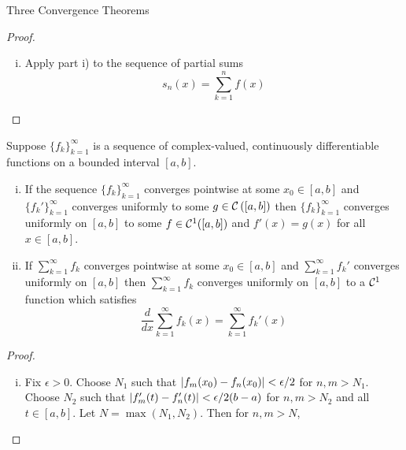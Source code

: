 \begin{section}{Three Convergence Theorems}
\begin{proof}
\begin{enumerate}[i)]
		\item
			Apply part i) to the sequence of partial sums
				\begin{displaymath}
					s_n(x) = \sum_{k=1}^n f(x)
				\end{displaymath}
	\end{enumerate}			
\end{proof}


\begin{thrm}\label{thrm:DerivUniConv}
	Suppose $\{f_k\}_{k=1}^\infty$ is a sequence of complex-valued,
	continuously differentiable functions on a bounded interval $[a,b]$.

		\begin{enumerate}[i)]
			\item
			If the sequence $\{f_k\}_{k=1}^\infty$ converges pointwise 
			at some $x_0 \in [a,b]$ and $\{f_k'\}_{k=1}^\infty$ converges
			uniformly to some $g \in \ctsab{a}{b}$ then $\{f_k\}_{k=1}^\infty$
			converges uniformly on $[a,b]$ to some $f \in \ctsdiff[1]([a,b])$
			and $f'(x) = g(x)$ for all $x \in [a,b]$.
			
			\item
			If $\sum_{k=1}^\infty f_k$ converges pointwise at some $x_0 \in
			[a,b]$ and $\sum_{k=1}^\infty f_k'$ converges uniformly on $[a,b]$
			then $\sum_{k=1}^\infty f_k$ converges uniformly on $[a,b]$ to a
			$\ctsdiff[1]$ function which satisfies
				\begin{displaymath}
					\frac{d}{dx}\sum_{k=1}^\infty f_k(x)
						= \sum_{k=1}^\infty f_k'(x)
				\end{displaymath}
		\end{enumerate}
\end{thrm}

\begin{proof}
	\begin{enumerate}[i)]
		\item
		Fix $\epsilon > 0$. Choose $N_1$ such that
		$\modulus{f_m(x_0) - f_n(x_0)} < \epsilon/2$ for
		$n, m > N_1$. Choose $N_2$ such that $\modulus{f_m'(t) -
		f_n'(t)} < \epsilon/2(b-a)$ for $n, m > N_2$ and all
		$t \in [a,b]$. Let $N =	\max(N_1, N_2)$. Then for $n, m > N$,
	

\end{enumerate}
\end{proof}
\end{section}
